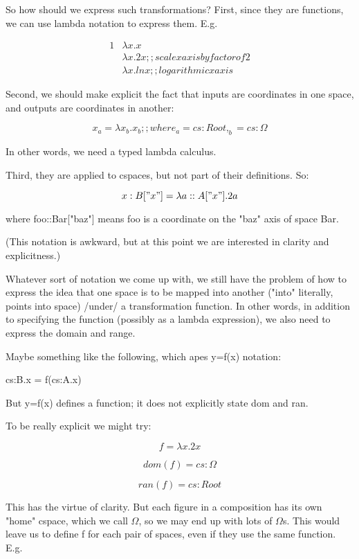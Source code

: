 \documentclass[12pt]{tufte-handout}
\numberwithin{equation}{subsection}
\numberwithin{equation}{subsection}
\begin{document}
  So how should we express such transformations?  First, since they are
  functions, we can use lambda notation to express them.  E.g.

  {
    \begin{alignat}{1}
      & \lambda x.x \\
      & \lambda x.2x   ;; scale x axis by factor of 2 \\
      & \lambda x.ln x ;; logarithmic x axis
    \end{alignat}
  }

  Second, we should make explicit the fact that inputs are coordinates
  in one space, and outputs are coordinates in another:

  $$x_a = \lambda x_b.x_b  ;; where _a = cs:Root, _b = cs:\Omega$$

  In other words, we need a typed lambda calculus.

  Third, they are applied to cspaces, but not part of their definitions.
  So:

  \begin{equation}
    x:B["x"] = \lambda a::A["x"].2a
  \end{equation}


  where foo::Bar["baz"] means foo is a coordinate on the "baz" axis of space Bar.

  (This notation is awkward, but at this point we are interested in
  clarity and explicitness.)

  Whatever sort of notation we come up with, we still have the problem
  of how to express the idea that one space is to be mapped into another
  ("into" literally, points into space) /under/ a transformation
  function.  In other words, in addition to specifying the function
  (possibly as a lambda expression), we also need to express the domain
  and range.

  Maybe something like the following, which apes y=f(x) notation:

  cs:B.x = f(cs:A.x)

  But y=f(x) defines a function; it does not explicitly state dom and ran.

  To be really explicit we might try:

  $$f = \lambda x.2x$$

  $$dom(f) = cs:\Omega$$

  $$ran(f) = cs:Root$$

  This has the virtue of clarity.  But each figure in a composition has
  its own "home" cspace, which we call $\Omega$, so we may end up with lots
  of $\Omega$s.  This would leave us to define f for each pair of spaces,
  even if they use the same function.  E.g.
\end{document}
